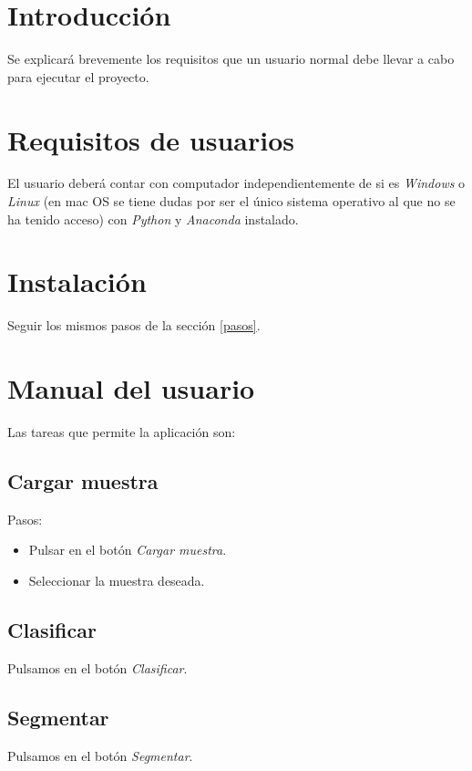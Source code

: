 
\section{Introducción}
Se explicará brevemente los requisitos que un usuario normal debe llevar a cabo para ejecutar el proyecto.
\section{Requisitos de usuarios}
El usuario deberá contar con computador independientemente de si es \emph{Windows} o \emph{Linux} (en mac OS se tiene dudas por ser el único sistema operativo al que no se ha tenido acceso) con \emph{Python} y \emph{Anaconda} instalado.
\section{Instalación}
Seguir los mismos pasos de la sección \ref{pasos}.

\section{Manual del usuario}
Las tareas que permite la aplicación son:
\subsection{Cargar muestra}
Pasos:
\begin{itemize}
    \item Pulsar en el botón \emph{Cargar muestra}.
    \item Seleccionar la muestra deseada.
\end{itemize}

\subsection{Clasificar}
Pulsamos en el botón \emph{Clasificar}.

\subsection{Segmentar}
Pulsamos en el botón \emph{Segmentar}.

